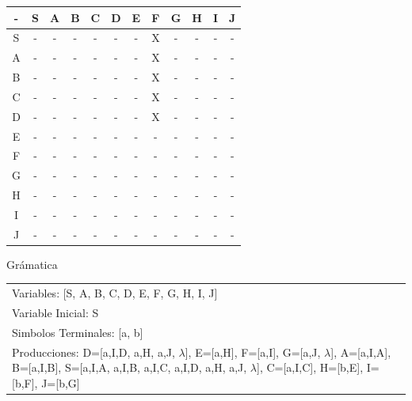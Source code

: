 \documentclass[a4paper,11pt]{article}
\newcommand{\MYp}[1]{ {\color[rgb]{0.392,0.392,0.392}#1} }
\begin{document}
\begin{center}
\begin{tabular}{||c||c||c||c||c||c||c||c||c||c||c||c||}
\hline
\hline
  -  & S & A & B & C & D & E & F & G & H & I & J \\ 
\hline
\hline
 S  &  -  &  -  &  -  &  -  &  -  &  -  &  X  &  -  &  -  &  -  &  -  \\ 
\hline
\hline
 A  &  -  &  -  &  -  &  -  &  -  &  -  &  X  &  -  &  -  &  -  &  -  \\ 
\hline
\hline
 B  &  -  &  -  &  -  &  -  &  -  &  -  &  X  &  -  &  -  &  -  &  -  \\ 
\hline
\hline
 C  &  -  &  -  &  -  &  -  &  -  &  -  &  X  &  -  &  -  &  -  &  -  \\ 
\hline
\hline
 D  &  -  &  -  &  -  &  -  &  -  &  -  &  X  &  -  &  -  &  -  &  -  \\ 
\hline
\hline
 E  &  -  &  -  &  -  &  -  &  -  &  -  &  -  &  -  &  -  &  -  &  -  \\ 
\hline
\hline
 F  &  -  &  -  &  -  &  -  &  -  &  -  &  -  &  -  &  -  &  -  &  -  \\ 
\hline
\hline
 G  &  -  &  -  &  -  &  -  &  -  &  -  &  -  &  -  &  -  &  -  &  -  \\ 
\hline
\hline
 H  &  -  &  -  &  -  &  -  &  -  &  -  &  -  &  -  &  -  &  -  &  -  \\ 
\hline
\hline
 I  &  -  &  -  &  -  &  -  &  -  &  -  &  -  &  -  &  -  &  -  &  -  \\ 
\hline
\hline
 J  &  -  &  -  &  -  &  -  &  -  &  -  &  -  &  -  &  -  &  -  &  -  \\ 
\hline
\hline
\end{tabular}
\end{center}
\MYp{\Huge Gr\'amatica}
\newline
\begin{center}\begin{tabular}{ m{15cm} }


Variables: [S, A, B, C, D, E, F, G, H, I, J] \\
Variable Inicial: S \\
Simbolos Terminales: [a, b] \\
Producciones: {D=[a,I,D, a,H, a,J, $\lambda$], E=[a,H], F=[a,I], G=[a,J, $\lambda$], A=[a,I,A], B=[a,I,B], S=[a,I,A, a,I,B, a,I,C, a,I,D, a,H, a,J, $\lambda$], C=[a,I,C], H=[b,E], I=[b,F], J=[b,G]} \\

\end{tabular}
\end{center}
\end{document}
